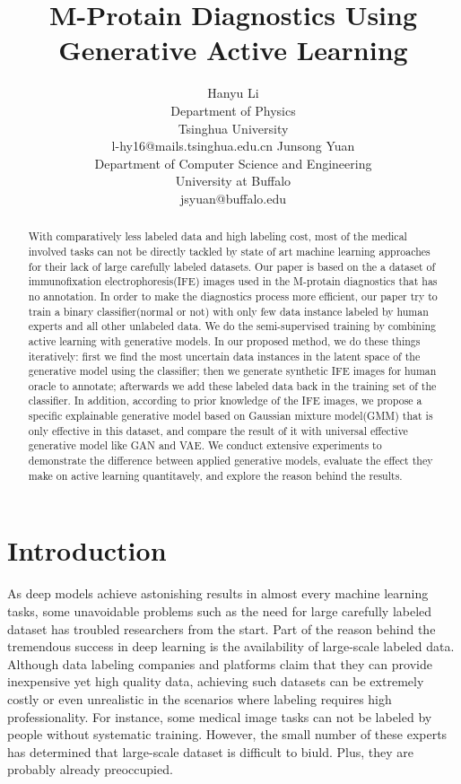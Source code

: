 \documentclass[letterpaper]{article}
\title{M-Protain Diagnostics Using Generative Active Learning}
\author{Hanyu Li\\
Department of Physics\\
Tsinghua University\\
l-hy16@mails.tsinghua.edu.cn
\And
Junsong Yuan\\
Department of Computer Science and Engineering\\
University at Buffalo\\
jsyuan@buffalo.edu}
\begin{document}
\maketitle


\begin{abstract}
    With comparatively less labeled data and high labeling cost, most of the medical involved tasks can not be directly tackled by state of art machine learning approaches for their lack of large carefully labeled datasets. Our paper is based on the a dataset of immunofixation electrophoresis(IFE) images used in the M-protain diagnostics that has no annotation. In order to make the diagnostics process more efficient, our paper try to train a binary classifier(normal or not) with only few data instance labeled by human experts and all other unlabeled data. We do the semi-supervised training by combining active learning with generative models. In our proposed method, we do these things iteratively: first we find the most uncertain data instances in the latent space of the generative model using the classifier; then we generate synthetic IFE images for human oracle to annotate; afterwards we add these labeled data back in the training set of the classifier. In addition, according to prior knowledge of the IFE images, we propose a specific explainable generative model based on Gaussian mixture model(GMM) that is only effective in this dataset, and compare the result of it with universal effective generative model like GAN and VAE. We conduct extensive experiments to demonstrate the difference between applied generative models, evaluate the effect they make on active learning quantitavely, and explore the reason behind the results.
\end{abstract}


\section{Introduction}
\par As deep models achieve astonishing results in almost every machine learning tasks, some unavoidable problems such as the need for large carefully labeled dataset has troubled researchers from the start. Part of the reason behind the tremendous success in deep learning is the availability of large-scale labeled data\cite{sun2017revisiting}. Although data labeling companies and platforms claim that they can provide inexpensive yet high quality data\cite{buhrmester2011amazon}, achieving such datasets can be extremely costly or even unrealistic in the scenarios where labeling requires high professionality. For instance, some medical image tasks can not be labeled by people without systematic training. However, the small number of these experts has determined that large-scale dataset is difficult to biuld. Plus, they are probably already preoccupied.
\end{document}

